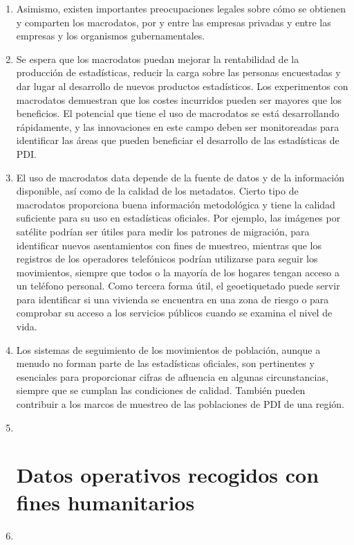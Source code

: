 \documentclass[
]{book}
\begin{document}
\begin{enumerate}
\item
  Asimismo, existen importantes preocupaciones legales sobre cómo se obtienen y comparten los macrodatos, por y entre las empresas privadas y entre las empresas y los organismos gubernamentales.
\item
  Se espera que los macrodatos puedan mejorar la rentabilidad de la producción de estadísticas, reducir la carga sobre las personas encuestadas y dar lugar al desarrollo de nuevos productos estadísticos. Los experimentos con macrodatos demuestran que los costes incurridos pueden ser mayores que los beneficios. El potencial que tiene el uso de macrodatos se está desarrollando rápidamente, y las innovaciones en este campo deben ser monitoreadas para identificar las áreas que pueden beneficiar el desarrollo de las estadísticas de PDI.
\item
  El uso de macrodatos data depende de la fuente de datos y de la información disponible, así como de la calidad de los metadatos. Cierto tipo de macrodatos proporciona buena información metodológica y tiene la calidad suficiente para su uso en estadísticas oficiales. Por ejemplo, las imágenes por satélite podrían ser útiles para medir los patrones de migración, para identificar nuevos asentamientos con fines de muestreo, mientras que los registros de los operadores telefónicos podrían utilizarse para seguir los movimientos, siempre que todos o la mayoría de los hogares tengan acceso a un teléfono personal. Como tercera forma útil, el geoetiquetado puede servir para identificar si una vivienda se encuentra en una zona de riesgo o para comprobar su acceso a los servicios públicos cuando se examina el nivel de vida.
\item
  Los sistemas de seguimiento de los movimientos de población, aunque a menudo no forman parte de las estadísticas oficiales, son pertinentes y esenciales para proporcionar cifras de afluencia en algunas circunstancias, siempre que se cumplan las condiciones de calidad. También pueden contribuir a los marcos de muestreo de las poblaciones de PDI de una región.
\item ~
  \hypertarget{datos-operativos-recogidos-con-fines-humanitarios}{%
  \section{Datos operativos recogidos con fines humanitarios}\label{datos-operativos-recogidos-con-fines-humanitarios}}
\item ~
  \hypertarget{diferencias-entre-los-datos-operativos-y-las-estaduxedsticas-oficiales}{%
}
\end{enumerate}
\end{document}
